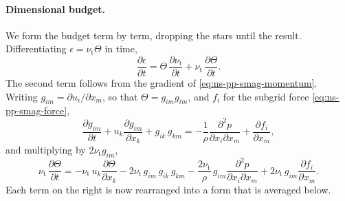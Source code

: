 \documentclass{article}
\begin{document}
\paragraph{Dimensional budget.}
We form the budget term by term, dropping the stars until the result.
Differentiating $\epsilon = \nu_{\mathrm{t}} \Theta$ in time,
\begin{equation}\label{eq:ns-pp-smag-split}
  \frac{\partial \epsilon}{\partial t}
  = \Theta\, \frac{\partial \nu_{\mathrm{t}}}{\partial t}
  + \nu_{\mathrm{t}}\, \frac{\partial \Theta}{\partial t} .
\end{equation}
The second term follows from the gradient of
\eqref{eq:ns-pp-smag-momentum}. Writing $g_{im} = \partial u_i / \partial x_m$,
so that $\Theta = g_{im} g_{im}$, and $f_i$ for the subgrid force
\eqref{eq:ns-pp-smag-force},
\begin{equation*}
  \frac{\partial g_{im}}{\partial t}
  + u_k \frac{\partial g_{im}}{\partial x_k}
  + g_{ik}\, g_{km}
  = -\frac{1}{\rho} \frac{\partial^2 p}{\partial x_i \partial x_m}
  + \frac{\partial f_i}{\partial x_m} ,
\end{equation*}
and multiplying by $2 \nu_{\mathrm{t}} g_{im}$,
\begin{equation}\label{eq:ns-pp-smag-dTheta}
  \nu_{\mathrm{t}}\, \frac{\partial \Theta}{\partial t}
  = - \nu_{\mathrm{t}}\, u_k \frac{\partial \Theta}{\partial x_k}
  - 2 \nu_{\mathrm{t}}\, g_{im}\, g_{ik}\, g_{km}
  - \frac{2 \nu_{\mathrm{t}}}{\rho}\, g_{im} \frac{\partial^2 p}{\partial x_i \partial x_m}
  + 2 \nu_{\mathrm{t}}\, g_{im} \frac{\partial f_i}{\partial x_m} .
\end{equation}
Each term on the right is now rearranged into a form that is averaged below.
\end{document}

